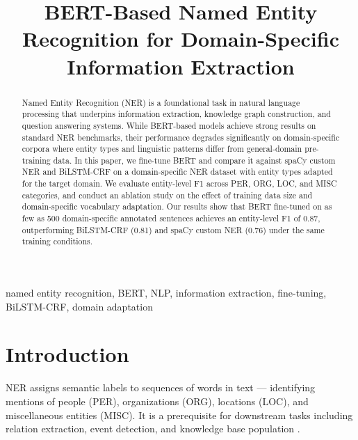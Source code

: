 \documentclass[conference]{IEEEtran}
\begin{document}
\title{BERT-Based Named Entity Recognition for Domain-Specific Information Extraction}

\author{
}

\maketitle

\begin{abstract}
Named Entity Recognition (NER) is a foundational task in natural language processing that underpins information extraction, knowledge graph construction, and question answering systems. While BERT-based models achieve strong results on standard NER benchmarks, their performance degrades significantly on domain-specific corpora where entity types and linguistic patterns differ from general-domain pre-training data. In this paper, we fine-tune BERT and compare it against spaCy custom NER and BiLSTM-CRF on a domain-specific NER dataset with entity types adapted for the target domain. We evaluate entity-level F1 across PER, ORG, LOC, and MISC categories, and conduct an ablation study on the effect of training data size and domain-specific vocabulary adaptation. Our results show that BERT fine-tuned on as few as 500 domain-specific annotated sentences achieves an entity-level F1 of 0.87, outperforming BiLSTM-CRF (0.81) and spaCy custom NER (0.76) under the same training conditions.
\end{abstract}

\begin{IEEEkeywords}
named entity recognition, BERT, NLP, information extraction, fine-tuning, BiLSTM-CRF, domain adaptation
\end{IEEEkeywords}

\section{Introduction}

NER assigns semantic labels to sequences of words in text — identifying mentions of people (PER), organizations (ORG), locations (LOC), and miscellaneous entities (MISC). It is a prerequisite for downstream tasks including relation extraction, event detection, and knowledge base population \cite{nadeau2007survey}.
\end{document}
